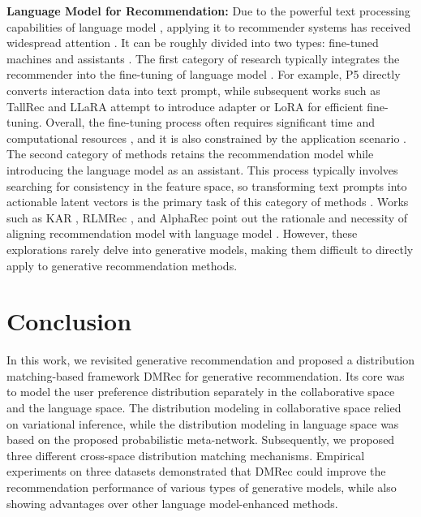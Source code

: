 \documentclass[sigconf]{acmart}
\begin{document}
\noindent
\textbf{Language Model for Recommendation:} Due to the powerful text processing capabilities of language model \cite{zhao2023survey}, applying it to recommender systems has received widespread attention \cite{geng2022recommendation, bao2023tallrec, guo2024prompt}. It can be roughly divided into two types: fine-tuned machines \cite{geng2022recommendation} and assistants \cite{ren2024representation}. The first category of research typically integrates the recommender into the fine-tuning of language model \cite{bao2023tallrec, touvron2023llama}. For example, P5 \cite{geng2022recommendation} directly converts interaction data into text prompt, while subsequent works such as TallRec \cite{bao2023tallrec} and LLaRA \cite{liao2024llara} attempt to introduce adapter or LoRA \cite{hulora} for efficient fine-tuning. Overall, the fine-tuning process often requires significant time and computational resources \cite{ren2024representation}, and it is also constrained by the application scenario \cite{kang2018self, liao2024llara}. The second category of methods retains the recommendation model while introducing the language model as an assistant. This process typically involves searching for consistency in the feature space, so transforming text prompts into actionable latent vectors is the primary task of this category of methods \cite{xi2024towards}. Works such as KAR \cite{xi2024towards}, RLMRec \cite{ren2024representation}, and AlphaRec \cite{sheng2024language} point out the rationale and necessity of aligning recommendation model with language model \cite{radford2021learning}. However, these explorations rarely delve into generative models, making them difficult to directly apply to generative recommendation methods.

\section{Conclusion}

In this work, we revisited generative recommendation and proposed a distribution matching-based framework \textsf{DMRec} for generative recommendation. Its core was to model the user preference distribution separately in the collaborative space and the language space. The distribution modeling in collaborative space relied on variational inference, while the distribution modeling in language space was based on the proposed probabilistic meta-network. Subsequently, we proposed three different cross-space distribution matching mechanisms. Empirical experiments on three datasets demonstrated that \textsf{DMRec} could improve the recommendation performance of various types of generative models, while also showing advantages over other language model-enhanced methods.
\end{document}
